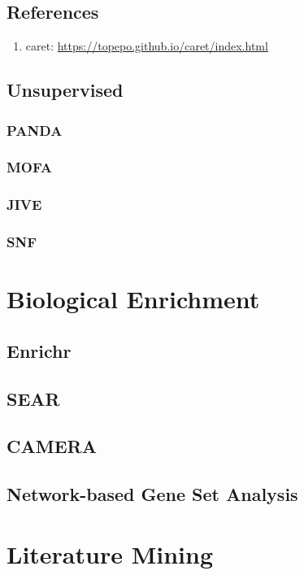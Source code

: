 \documentclass[]{book}
\providecommand{\tightlist}{%
  \setlength{\itemsep}{0pt}\setlength{\parskip}{0pt}}
\begin{document}
\section{References}\label{references-2}

\begin{enumerate}
\def\labelenumi{\arabic{enumi}.}
\tightlist
\item
  caret: \url{https://topepo.github.io/caret/index.html}
\end{enumerate}

\section{Unsupervised}\label{unsupervised}

\subsection{PANDA}\label{panda-1}

\subsection{MOFA}\label{mofa}

\subsection{JIVE}\label{jive}

\subsection{SNF}\label{snf}

\chapter{Biological Enrichment}\label{bio-enrichment}

\section{Enrichr}\label{enrichr}

\section{SEAR}\label{sear}

\section{CAMERA}\label{camera}

\section{Network-based Gene Set
Analysis}\label{network-based-gene-set-analysis}

\chapter{Literature Mining}\label{lit}


\end{document}
